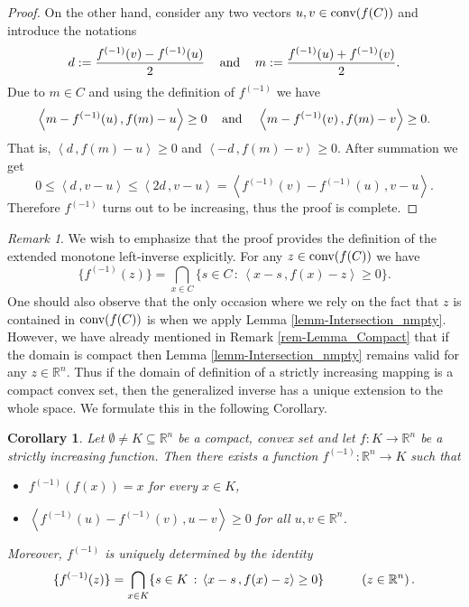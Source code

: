 \documentclass[12pt]{amsart}
\newtheorem{coro}{Corollary}%
\theoremstyle{remark}
\newtheorem{remark}{Remark}%
\theoremstyle{definition}
\newcommand{\Rn}{\mathbb{R}^n}
\newcommand{\exmo}{extended monotone left-inverse }
\newcommand{\conv}{\mbox{\rm conv}}
\newcommand{\map}{\longrightarrow}
\newcommand{\bsz}[2]{\left \langle #1 \,, #2 \right \rangle}
\begin{document}
\begin{proof}
On the other hand, consider any two vectors 
$ u,v \in \conv (f(C)) $ and introduce the notations 
\[
d := \frac{f^{(-1)}(v) - f^{(-1)}(u)}{2} 
\hspace{3mm} \mbox{ and } \hspace{3mm} 
m := \frac{f^{(-1)}(u) + f^{(-1)}(v)}{2}.
\]
Due to $ m \in C $ and using the definition of 
$ f^{(-1)} $ we have 
\[
\bsz{m-f^{(-1)}(u)}{f(m)-u} \geq 0  
\hspace{3mm} \mbox{ and } \hspace{3mm} 
\bsz{m-f^{(-1)}(v)}{f(m)-v} \geq 0. 
\]
That is, $ \bsz{d}{f(m)-u} \geq 0 $ and 
$ \bsz{-d}{f(m)-v} \geq 0 $. After summation we get 
\[
0 \leq \bsz{d}{v-u} \leq \bsz{2d}{v-u} 
= \bsz{f^{(-1)}(v) - f^{(-1)}(u)}{v-u}. 
\]
Therefore $ f^{(-1)} $ turns out to be increasing, 
thus the proof is complete.  
\end{proof}

\begin{remark}
We wish to emphasize that the proof provides the 
definition of the \exmo explicitly. For 
any $ z \in \conv (f(C)) $ we have 
\[
\lbrace f^{(-1)}(z) \rbrace = 
\bigcap_{x \in C} 
\lbrace s \in C \, : \, 
\bsz{x-s}{f(x)-z} \geq 0 
\rbrace. 
\] 
One should also observe that the only occasion where 
we rely on the fact that $ z $ is contained in 
$ \conv (f(C)) $ is when we apply 
Lemma \ref{lemm-Intersection_nmpty}. 
However, we have already mentioned in 
Remark \ref{rem-Lemma_Compact} that if the 
domain is compact then 
Lemma \ref{lemm-Intersection_nmpty} remains valid 
for any $ z \in \Rn $. 
Thus if the domain of definition of a strictly increasing 
mapping is a compact convex set, then 
the generalized inverse has a unique extension to the 
whole space. We formulate this in the following Corollary. 
\end{remark}

\begin{coro}\label{coro-Compact_domain}
Let $ \emptyset \neq K \subseteq \Rn $ be a 
compact, convex set and let
$ f : K \map \Rn $ be a strictly increasing function. 
Then there exists a function 
$ f^{(-1)} : \Rn \map K $ 
such that 
\begin{itemize}
\item $ f^{(-1)} \left( f(x) \right) = x $ 
for every $ x \in K $, 
\item $ \bsz{ f^{(-1)}(u)- 
f^{(-1)}(v) }{ u-v } \geq 0 $  
for all $ u,v \in \Rn  $. 
\end{itemize}
Moreover, $ f^{(-1)} $ is uniquely determined by the 
identity 
\[
\lbrace f^{(-1)}(z) \rbrace = 
\bigcap_{x \in K} 
\lbrace s \in K \, : \, 
\bsz{x-s}{f(x)-z} \geq 0 
\rbrace
\hspace{10mm} \left( z \in \Rn \right). 
\] 
\end{coro}
\end{document}
